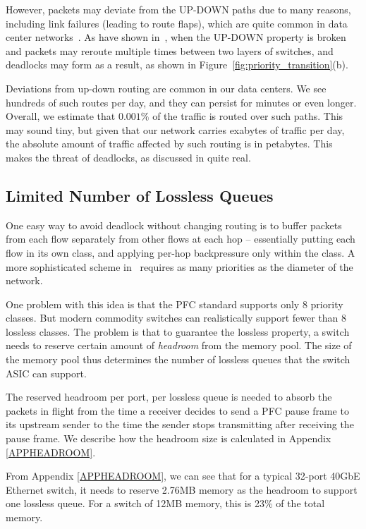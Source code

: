 However, packets may deviate from the UP-DOWN paths due to many reasons,
including link failures (leading to route flaps), which are quite common in data
center networks~\cite{netpilot,f10}.  As have shown
in~\cite{shpiner2016unlocking}, when the UP-DOWN property is broken and packets
may reroute multiple times between two layers of switches, and deadlocks may
form as a result, as shown in Figure~\ref{fig:priority_transition}(b).

Deviations from up-down routing are common in our data centers.  We
see hundreds of such routes per day, and they can persist for minutes or even
longer. Overall, we estimate that $0.001\%$ of the traffic is routed over such
paths. This may sound tiny, but given that our network carries exabytes of
traffic per day, the absolute amount of traffic affected by such routing is
in petabytes. This makes the threat of deadlocks, as discussed
in\cite{rdmaatscale,shpiner2016unlocking,hu2016deadlocks} quite real.

\subsection{Limited Number of Lossless Queues}
\label{subsec:pfcheadroom}

One easy way to avoid deadlock without changing routing is to buffer packets
from each flow separately from other flows at each hop -- essentially putting
each flow in its own class, and applying per-hop backpressure only within the
class.  A more sophisticated scheme in~\cite{karol2003prevention} requires as
many priorities as the diameter of the network. 

One problem with this idea is that the PFC standard supports only 8 priority
classes. But modern commodity switches can realistically support fewer than 8
lossless classes.  The problem is that  to guarantee the lossless property, a
switch needs to reserve certain amount of {\it headroom} from the memory pool.
The size of the memory pool thus determines the number of lossless queues that
the switch ASIC can support.

The reserved headroom per port, per lossless queue is needed to absorb the
packets in flight from the time a receiver decides to send a PFC pause frame to
its upstream sender to the time the sender stops transmitting after receiving
the pause frame. We describe how the
headroom size is calculated in Appendix \ref{APPHEADROOM}.

From Appendix \ref{APPHEADROOM}, we can see that for a typical 32-port 40GbE
Ethernet switch, it needs to reserve 2.76MB memory as the headroom to support
one lossless queue. For a switch of 12MB memory, this is 23\% of the total
memory.

